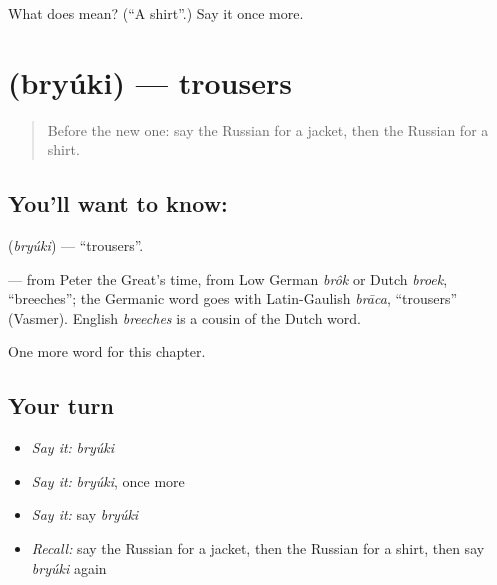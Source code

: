 \begin{tcolorbox}[breakable,colback=teal!4,colframe=teal!35!black,title={Before you move on}]
What does  mean? (\textquotedblleft{}A shirt\textquotedblright{}.) Say it once more.
\end{tcolorbox}
\section[\texorpdfstring{\ru{брюки} (bryúki)}{брюки (bryúki)}]{ (bryúki) — trousers}

\label{lesson:RU-C103-trousers}



\begin{quote}
Before the new one: say the Russian for a jacket, then the Russian for a shirt.
\end{quote}

\subsection*{You'll want to know: }
\textbf{} (\emph{bryúki}) — \textquotedblleft{}trousers\textquotedblright{}.

\begin{cousinweb}
\textbf{} — from Peter the Great's time, from Low German \emph{brôk} or Dutch \emph{broek}, \textquotedblleft{}breeches\textquotedblright{}; the Germanic word goes with Latin-Gaulish \emph{brāca}, \textquotedblleft{}trousers\textquotedblright{} (Vasmer). English \emph{breeches} is a cousin of the Dutch word.
\end{cousinweb}

\begin{grammarlens}[title={What you've built}]
One more word for this chapter.
\end{grammarlens}

\subsection*{Your turn}
\begin{itemize}
\raggedright
  \item \emph{Say it:} \emph{bryúki}
  \item \emph{Say it:} \emph{bryúki}, once more
  \item \emph{Say it:} say \emph{bryúki}
  \item \emph{Recall:} say the Russian for a jacket, then the Russian for a shirt, then say \emph{bryúki} again
\end{itemize}

